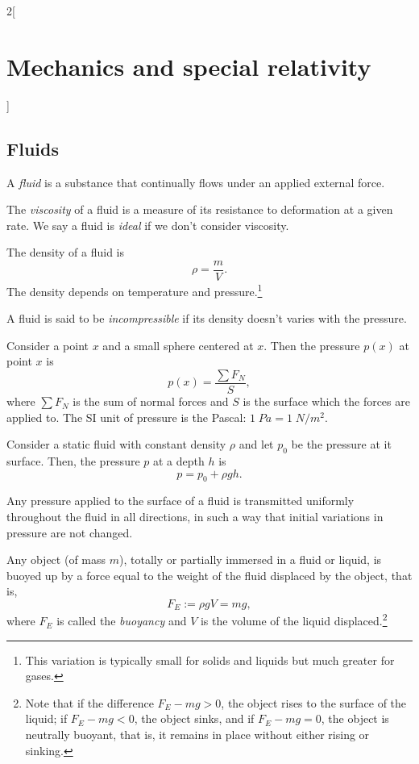\documentclass[../../../main.tex]{subfiles}
\begin{document}
\begin{multicols}{2}[\section{Mechanics and special relativity}]
\subsection{Fluids}
\begin{definition}
A \textit{fluid} is a substance that continually flows under an applied external force.
\end{definition}
\begin{definition}
The \textit{viscosity} of a fluid is a measure of its resistance to deformation at a given rate. We say a fluid is \textit{ideal} if we don't consider viscosity.
\end{definition}
\begin{concept}[Density]
The density of a fluid is $$\rho=\frac{m}{V}.$$ The density depends on temperature and pressure.\footnote{This variation is typically small for solids and liquids but much greater for gases.}
\end{concept}
\begin{definition}
A fluid is said to be \textit{incompressible} if its density doesn't varies with the pressure. 
\end{definition}
\begin{concept}[Pressure]
Consider a point $x$ and a small sphere centered at $x$. Then the pressure $p(x)$ at point $x$ is $$p(x)=\frac{\sum F_N}{S},$$ where $\sum F_N$ is the sum of normal forces and $S$ is the surface which the forces are applied to. The SI unit of pressure is the Pascal: $1\;Pa=1\;N/m^2$.
\end{concept}
\begin{concept}
Consider a static fluid with constant density $\rho$ and let $p_0$ be the pressure at it surface. Then, the pressure $p$ at a depth $h$ is $$p=p_0+\rho gh.$$
\end{concept}
\begin{concept}
Any pressure applied to the surface of a fluid is transmitted uniformly throughout the fluid in all directions, in such a way that initial variations in pressure are not changed.
\end{concept}
\begin{concept}
Any object (of mass $m$), totally or partially immersed in a fluid or liquid, is buoyed up by a force equal to the weight of the fluid displaced by the object, that is, $$F_E:=\rho gV=mg,$$ where $F_E$ is called the \textit{buoyancy} and $V$ is the volume of the liquid displaced.\footnote{Note that if the difference $F_E-mg>0$, the object rises to the surface of the liquid; if $F_E-mg<0$, the object sinks, and if $F_E-mg=0$, the object is neutrally buoyant, that is, it remains in place without either rising or sinking.}

\end{concept}
\end{multicols}
\end{document}
